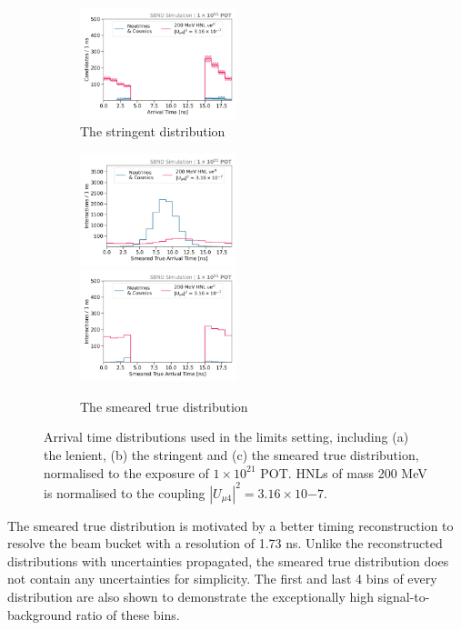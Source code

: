 \begin{figure}[htbp!]
\begin{subfigure}[b]{1.0\textwidth}
            \includegraphics[width=0.5\textwidth]{strict_cut_edge}
            \caption{The stringent distribution}%
	    \label{fig:final_strict}
       	    \vspace{0.5cm}
        \end{subfigure}
        \begin{subfigure}[b]{1.0\textwidth}
            \includegraphics[width=0.5\textwidth]{smeared_truth}
            \includegraphics[width=0.5\textwidth]{smeared_truth_edge}
            \caption{The smeared true distribution}%
	    \label{fig:final_truth}
     	    \vspace{0.5cm}
        \end{subfigure}
        \caption[Arrival Time Distributions input to the Limits Setting]{
	Arrival time distributions used in the limits setting, including (a) the lenient, (b) the stringent and (c) the smeared true distribution,
	normalised to the exposure of $1 \times 10^{21}$ POT.
	HNLs of mass 200 MeV is normalised to the coupling $|U_{\mu4}|^2 = 3.16 \times 10{-7}$.
	}
\end{figure}
The smeared true distribution is motivated by a better timing reconstruction to resolve the beam bucket with a resolution of 1.73 ns.
Unlike the reconstructed distributions with uncertainties propagated, the smeared true distribution does not contain any uncertainties for simplicity. 
The first and last 4 bins of every distribution are also shown to demonstrate the exceptionally high signal-to-background ratio of these bins.


